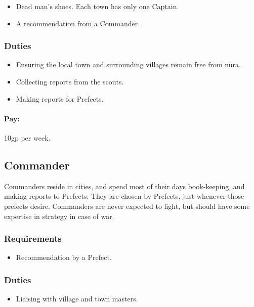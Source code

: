 \begin{multicols}{2}
\begin{itemize}
  \item
  Dead man's shoes.
  Each town has only one Captain.
  \item
  A recommendation from a Commander.
\end{itemize}

\subsubsection{Duties}

\begin{itemize}
  \item
  Ensuring the local town and surrounding villages remain free from nura.
  \item
  Collecting reports from the scouts.
  \item
  Making reports for Prefects.
\end{itemize}

\paragraph{Pay:}
10gp per week.

\subsection{Commander}

Commanders reside in cities, and spend most of their days book-keeping, and making reports to Prefects.
They are chosen by Prefects, just whenever those prefects desire.
Commanders are never expected to fight, but should have some expertise in strategy in case of war.

\subsubsection{Requirements}

\begin{itemize}
  \item
  Recommendation by a Prefect.
\end{itemize}

\subsubsection{Duties}

\begin{itemize}
  \item
  Liaising with village and town masters.
\end{itemize}


\end{multicols}
